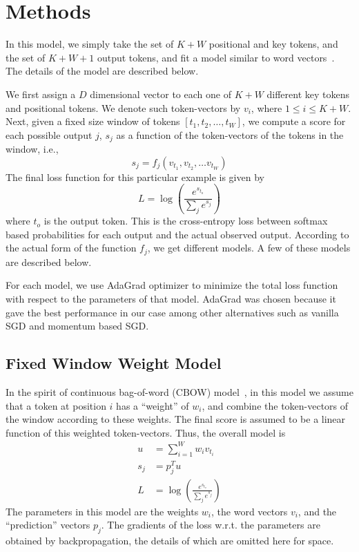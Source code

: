\section{Methods}
\label{sec:methods}

\noindent
In this model, we simply take the set of $K+W$ positional and key tokens, and
the set of $K+W+1$ output tokens, and fit a model similar to word
vectors~\cite{ref:mikolov:wvec}. The details of the model are described below.

We first assign a $D$ dimensional vector to each one of $K+W$ different key
tokens and positional tokens. We denote such token-vectors by $v_i$, where $1
\leq i \leq K+W$. Next, given a fixed size window of tokens $[t_1, t_2, \ldots,
t_W]$, we compute a score for each possible output $j$, $s_j$ as a function of
the token-vectors of the tokens in the window, i.e.,
\[
s_j = f_j\left(v_{t_1}, v_{t_2}, \ldots v_{t_W}\right)
\]
The final loss function for this particular example is given by 
\[
L = \log\left(\frac{e^{s_{t_o}}}{\sum_j{e^{s_j}}}\right)
\]
where $t_o$ is the output token. This is the cross-entropy loss
between softmax based probabilities for each output and the actual observed
output. According to the actual form of the function $f_j$, we get different
models. A few of these models are described below.

For each model, we use {\sc AdaGrad} optimizer to minimize the total loss
function with respect to the parameters of that model. {\sc AdaGrad} was chosen
because it gave the best performance in our case among other alternatives such
as vanilla SGD and momentum based SGD.

\subsection{Fixed Window Weight Model}
In the spirit of continuous bag-of-word (CBOW) model~\cite{ref:mikolov:wvec}, in
this model we assume that a token at position $i$ has a ``weight'' of $w_i$, and
combine the token-vectors of the window according to these weights. The final
score is assumed to be a linear function of this weighted token-vectors. Thus,
the overall model is
\begin{align}
u &= \sum_{i=1}^{W}{w_i v_{t_i}}\\
s_j &= p_j^Tu\\
L &= \log\left(\frac{e^{s_{t_o}}}{\sum_j{e^{s_j}}}\right)
\end{align}
The parameters in this model are the weights $w_i$, the word vectors $v_i$, and
the ``prediction'' vectors $p_j$. The gradients of the loss w.r.t. the
parameters are obtained by backpropagation, the details of which are omitted
here for space.

